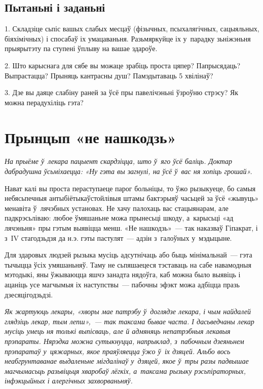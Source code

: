 \subsection*{Пытаньні і заданьні}

1. Складзіце сьпіс вашых слабых месцаў (фізычных, псыхалягічных, сацыяльных, біяхімічных) і спосабаў іх умацаваньня. Разьмяркуйце іх у~парадку зьніжэньня прыярытэту па ступені ўплыву на вашае здароўе.

2. Што карыснага для сябе вы можаце зрабіць проста цяпер? Папрысядаць? Выпрастацца? Прыняць кантрасны душ? Памэдытаваць 5 хвілінаў?

3. Дзе вы даяце слабіну раней за ўсё пры павелічэньні ўзроўню стрэсу? Як можна перадухіліць гэта?


\section{Прынцып «не нашкодзь»}

\emph{На прыёме ў~лекара пацыент скардзіцца, што ў~яго ўсё баліць. Доктар дабрадушна ўсьміхаецца: «Ну гэта вы загнулі, на ўсё ў~вас ня хопіць грошай».}

Нават калі вы проста пераступаеце парог больніцы, то ўжо рызыкуеце, бо самыя небясьпечныя антыбіётыкаўстойлівыя штамы бактэрыяў часьцей за ўсё «жывуць» менавіта ў~лячэбных установах. Не хачу палохаць вас стацыянарам, але падкрэсьліваю: любое ўмяшаньне можа прынесьці шкоду, а~карысьці «ад лячэньня» пры гэтым выявіцца менш. «Не нашкодзь»~--- так наказваў Гіпакрат, і з~IV стагодзьдзя да н.э. гэты пастулят~--- адзін з~галоўных у~мэдыцыне. 


Для здаровых людзей рызыка мусіць адсутнічаць або быць мінімальнай~--- гэта тычыцца ўсіх умяшаньняў. Таму не сьпяшаецеся тэставаць на сабе навамодныя мэтодыкі, яны ўжываюцца яшчэ занадта нядоўга, каб можна было выявіць і ацаніць усе магчымыя іх наступствы~--- пабочны эфэкт можа адбіцца празь дзесяцігодзьдзі.

\emph{Як жартуюць лекары, «хворы мае патрэбу ў~доглядзе лекара, і чым найдалей глядзіць лекар, тым лепш»,~--- так таксама бывае часта. І дасьведчаны лекар мусіць умець ня толькі выпісваць, але й адмяняць непатрэбныя лекавыя прэпараты. Нярэдка можна сутыкнуцца, напрыклад, з~пабочным дзеяньнем прэпаратаў у~цяжарных, якое праяўляецца ўжо ў~іх дзяцей. Альбо вось неабгрунтаванае выдаленьне мігдалінаў у~дзяцей, якое ў~тры разы падвышае магчымасьць разьвіцьця хваробаў лёгкіх, а~таксама рызыку рэсьпіраторных, інфэкцыйных і алергічных захворваньняў.}

